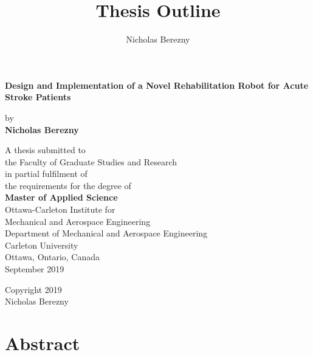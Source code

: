 \documentclass[12pt]{report}
\author{Nicholas Berezny}
\title{Thesis Outline}
\begin{document}
\newpage

\begin{center}
{\LARGE \textbf{Design and Implementation of a Novel Rehabilitation Robot for Acute Stroke  Patients}}

\vspace{1.5cm}
by  \\
\vspace{1.5cm}
{\Large \textbf{Nicholas Berezny}}
\vspace{1cm}

A thesis submitted to \\
the Faculty of Graduate Studies and Research \\
in partial fulfilment of \\
the requirements for the degree of \\
\textbf{Master of Applied Science} \\

\vspace{1cm}
Ottawa-Carleton Institute for \\
Mechanical and Aerospace Engineering \\

\vspace{1cm}
Department of Mechanical and Aerospace Engineering \\
Carleton University \\
Ottawa, Ontario, Canada \\
September 2019 \\
\vspace{1cm}

Copyright \textcopyright \hspace{0.08cm} 2019 \\
Nicholas Berezny
\end{center}
\thispagestyle{empty}
\clearpage
\newpage
{} 





\chapter*{Abstract}
\end{document}
